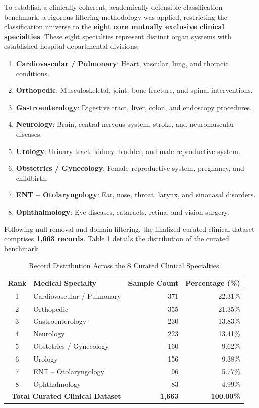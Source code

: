 To establish a clinically coherent, academically defensible classification benchmark, a rigorous filtering methodology was applied, restricting the classification universe to the \textbf{eight core mutually exclusive clinical specialties}. These eight specialties represent distinct organ systems with established hospital departmental divisions:
\begin{enumerate}
    \item \textbf{Cardiovascular / Pulmonary}: Heart, vascular, lung, and thoracic conditions.
    \item \textbf{Orthopedic}: Musculoskeletal, joint, bone fracture, and spinal interventions.
    \item \textbf{Gastroenterology}: Digestive tract, liver, colon, and endoscopy procedures.
    \item \textbf{Neurology}: Brain, central nervous system, stroke, and neuromuscular diseases.
    \item \textbf{Urology}: Urinary tract, kidney, bladder, and male reproductive system.
    \item \textbf{Obstetrics / Gynecology}: Female reproductive system, pregnancy, and childbirth.
    \item \textbf{ENT -- Otolaryngology}: Ear, nose, throat, larynx, and sinonasal disorders.
    \item \textbf{Ophthalmology}: Eye diseases, cataracts, retina, and vision surgery.
\end{enumerate}

Following null removal and domain filtering, the finalized curated clinical dataset comprises \textbf{1,663 records}. Table \ref{tab:curated_8classes} details the distribution of the curated benchmark.

\begin{table}[H]
\centering
\small
\setlength{\tabcolsep}{6pt}
\begin{tabularx}{\linewidth}{|c|>{\raggedright\arraybackslash}X|r|r|}
\hline
\textbf{Rank} & \textbf{Medical Specialty} & \textbf{Sample Count} & \textbf{Percentage (\%)} \\
\hline
1 & Cardiovascular / Pulmonary & 371 & 22.31\% \\
\hline
2 & Orthopedic & 355 & 21.35\% \\
\hline
3 & Gastroenterology & 230 & 13.83\% \\
\hline
4 & Neurology & 223 & 13.41\% \\
\hline
5 & Obstetrics / Gynecology & 160 & 9.62\% \\
\hline
6 & Urology & 156 & 9.38\% \\
\hline
7 & ENT -- Otolaryngology & 96 & 5.77\% \\
\hline
8 & Ophthalmology & 83 & 4.99\% \\
\hline
\multicolumn{2}{|r|}{\textbf{Total Curated Clinical Dataset}} & \textbf{1,663} & \textbf{100.00\%} \\
\hline
\end{tabularx}
\caption{Record Distribution Across the 8 Curated Clinical Specialties}
\label{tab:curated_8classes}
\end{table}

